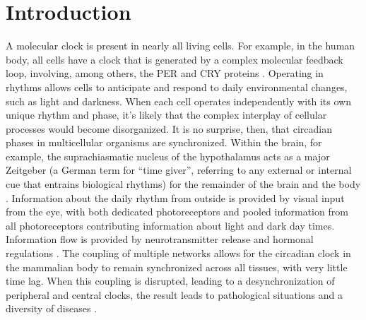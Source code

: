 \documentclass{article}
\begin{document}

\section{Introduction}
A molecular clock is present in nearly all living cells. For example, in the human body, all cells have a clock that is generated by a complex molecular feedback loop, involving, among others, the PER and CRY proteins \cite{takahashi_transcriptional_2017}. Operating in rhythms allows cells to anticipate and respond to daily environmental changes, such as light and darkness. When each cell operates independently with its own unique rhythm and phase, it's likely that the complex interplay of cellular processes would become disorganized. It is no surprise, then, that circadian phases in multicellular organisms are synchronized. Within the brain, for example, the suprachiasmatic nucleus of the hypothalamus acts as a major Zeitgeber (a German term for ``time giver'', referring to any external or internal cue that entrains biological rhythms) for the remainder of the brain and the body \cite{finger_coupled_2020}. Information about the daily rhythm from outside is provided by visual input from the eye, with both dedicated photoreceptors\cite{berson_phototransduction_2002} and pooled information from all photoreceptors contributing information about light and dark day times. Information flow is provided by neurotransmitter release and hormonal regulations \cite{finger_coupled_2020}. The coupling of multiple networks allows for the circadian clock in the mammalian body to remain synchronized across all tissues, with very little time lag. When this coupling is disrupted, leading to a desynchronization of peripheral and central clocks, the result leads to pathological situations and a diversity of diseases \cite{finger_coupled_2020}.
  
\end{document}
